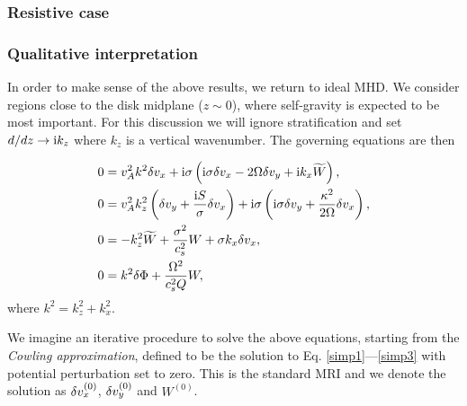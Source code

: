 \subsubsection{Resistive case}




\subsubsection{Qualitative interpretation} 
In order to make sense of the above results, we return to ideal MHD. 
We consider regions close to the disk midplane ($z\sim 0$), where
self-gravity is expected to be most important. For this discussion we
will ignore stratification and set $d/dz\to \mathrm{i} k_z$ where $k_z$ is
a vertical wavenumber. The governing equations are then

\begin{align}
  &  0= v_A^2k^2\delta v_x + \mathrm{i}\sigma\left(\mathrm{i}\sigma \delta v_x - 2\Omega\delta v_y + \mathrm{i} k_x \widetilde{W}\right),\label{simp1}\\
  &  0= v_A^2k_z^2\left(\delta v_y + \frac{\mathrm{i} S
  }{\sigma}\delta v_x\right) + \mathrm{i}\sigma\left(\mathrm{i}\sigma\delta v_y +
  \frac{\kappa^2}{2\Omega}\delta v_x\right),\label{simp2}\\
  & 0 = -k_z^2\widetilde{W} + \frac{\sigma^2}{c_s^2}W + \sigma k_x \delta v_x, \label{simp3}\\
  & 0 = k^2\delta \Phi + \frac{\Omega^2}{c_s^2Q}W,\label{simp4}
\end{align}
where $k^2 = k_z^2 + k_x^2$. 

We imagine an iterative procedure to solve the above equations,
starting from the \emph{Cowling approximation}, defined to be the
solution to Eq. \ref{simp1}---\ref{simp3} with potential perturbation
set to zero. This is the standard MRI and we denote the solution as
$\delta v_x^{(0)}$, $\delta v_y^{(0)}$ and $W^{(0)}$. 




